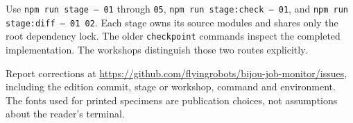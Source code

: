 Use \texttt{npm run stage -- 01} through \texttt{05}, \texttt{npm run stage:check -- 01}, and \texttt{npm run stage:diff -- 01 02}. Each stage owns its source modules and shares only the root dependency lock. The older \texttt{checkpoint} commands inspect the completed implementation. The workshops distinguish those two routes explicitly.

Report corrections at \url{https://github.com/flyingrobots/bijou-job-monitor/issues}, including the edition commit, stage or workshop, command and environment. The fonts used for printed specimens are publication choices, not assumptions about the reader's terminal.
